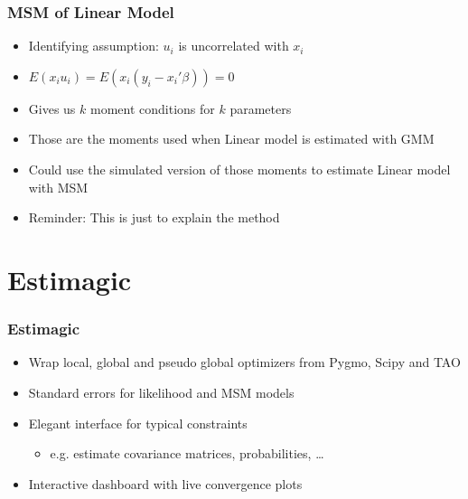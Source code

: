 \documentclass[11pt]{beamer}
\begin{document}
\begin{frame}[c]\frametitle{MSM of Linear Model}
    \begin{itemize}
        \item Identifying assumption: $u_i$ is uncorrelated with $x_i$
        \item $E(x_i u_i) = E(x_i (y_i - x_i' \beta)) = 0$
        \item Gives us $k$ moment conditions for $k$ parameters
        \item Those are the moments used when Linear model is estimated with GMM
        \item Could use the simulated version of those moments to estimate Linear model with MSM
        \item Reminder: This is just to explain the method
    \end{itemize}
\end{frame}






\section{Estimagic}



\begin{frame}[c]\frametitle{Estimagic}
    \begin{itemize}
        \item Wrap local, global and pseudo global optimizers from Pygmo, Scipy and TAO
        \item Standard errors for likelihood and MSM models
        \item Elegant interface for typical constraints
        \begin{itemize}
            \item e.g. estimate covariance matrices, probabilities, \ldots
        \end{itemize}
        \item Interactive dashboard with live convergence plots
    \end{itemize}
\end{frame}
\end{document}
